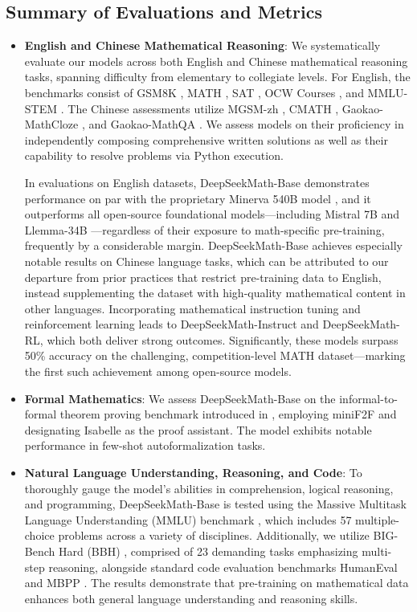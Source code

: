 \subsection{Summary of Evaluations and Metrics}

\begin{itemize}[topsep=0pt]
    \item \textbf{English and Chinese Mathematical Reasoning}: We systematically evaluate our models across both English and Chinese mathematical reasoning tasks, spanning difficulty from elementary to collegiate levels. For English, the benchmarks consist of GSM8K \citep{gsm8k}, MATH \citep{MATH}, SAT \citep{llemma}, OCW Courses \citep{minerva}, and MMLU-STEM \citep{mmlu}. The Chinese assessments utilize MGSM-zh \citep{mgsm}, CMATH \citep{wei2023cmath}, Gaokao-MathCloze \citep{agieval}, and Gaokao-MathQA \citep{agieval}. We assess models on their proficiency in independently composing comprehensive written solutions as well as their capability to resolve problems via Python execution.

In evaluations on English datasets, DeepSeekMath-Base demonstrates performance on par with the proprietary Minerva 540B model \citep{minerva}, and it outperforms all open-source foundational models—including Mistral 7B \citep{mistral} and Llemma-34B \citep{llemma}—regardless of their exposure to math-specific pre-training, frequently by a considerable margin. DeepSeekMath-Base achieves especially notable results on Chinese language tasks, which can be attributed to our departure from prior practices \citep{minerva,llemma} that restrict pre-training data to English, instead supplementing the dataset with high-quality mathematical content in other languages. Incorporating mathematical instruction tuning and reinforcement learning leads to DeepSeekMath-Instruct and DeepSeekMath-RL, which both deliver strong outcomes. Significantly, these models surpass 50\% accuracy on the challenging, competition-level MATH dataset—marking the first such achievement among open-source models.

\item \textbf{Formal Mathematics}: We assess DeepSeekMath-Base on the informal-to-formal theorem proving benchmark introduced in \citep{dsp_proof}, employing miniF2F \citep{minif2f} and designating Isabelle \citep{isabelle} as the proof assistant. The model exhibits notable performance in few-shot autoformalization tasks.
\item \textbf{Natural Language Understanding, Reasoning, and Code}: To thoroughly gauge the model's abilities in comprehension, logical reasoning, and programming, DeepSeekMath-Base is tested using the Massive Multitask Language Understanding (MMLU) benchmark \citep{mmlu}, which includes 57 multiple-choice problems across a variety of disciplines. Additionally, we utilize BIG-Bench Hard (BBH) \citep{bbh}, comprised of 23 demanding tasks emphasizing multi-step reasoning, alongside standard code evaluation benchmarks HumanEval \citep{codex} and MBPP \citep{mbpp}. The results demonstrate that pre-training on mathematical data enhances both general language understanding and reasoning skills.


\end{itemize}
